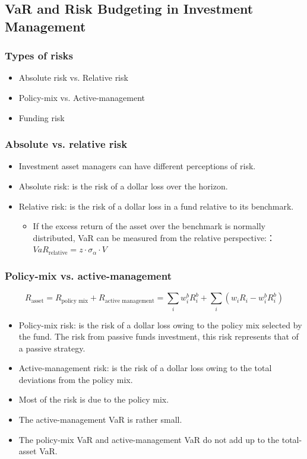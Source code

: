 \subsection{VaR and Risk Budgeting in Investment Management}


\subsubsection{Types of risks}
\begin{itemize}
\item Absolute risk vs. Relative risk
\item Policy-mix vs. Active-management
\item Funding risk
\end{itemize}



\subsubsection{Absolute vs. relative risk}
\begin{itemize}
\item Investment asset managers can have different perceptions of risk.
\item Absolute risk: is the risk of a dollar loss over the horizon.
\item Relative risk: is the risk of a dollar loss in a fund relative to its benchmark.
    \begin{itemize}
    \item If the excess return of the asset over the benchmark is normally distributed, VaR can be measured from the relative perspective:：$VaR_{\text{relative}} = z \cdot \sigma_{\alpha} \cdot V$
    \end{itemize}
    
\end{itemize}



\subsubsection{Policy-mix vs. active-management}
\[
R_{\text{asset}} = R_{\text{policy mix}} + R_{\text{active management}} = \sum_{i} w_i^b R_i^b + \sum_{i} (w_i R_i - w_i^b R_i^b)
\]
\begin{itemize}
\item Policy-mix risk: is the risk of a dollar loss owing to the policy mix selected by the fund. The risk from passive funds investment, this risk represents that of a passive strategy.
\item Active-management risk: is the risk of a dollar loss owing to the total deviations from the policy mix.
\item Most of the risk is due to the policy mix.
\item The active-management VaR is rather small.
\item The policy-mix VaR and active-management VaR do not add up to the total-asset VaR.
\end{itemize}



